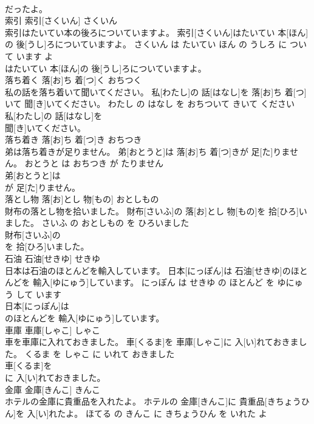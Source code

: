\documentclass[8pt]{extreport}
\begin{document}
\begin{CJK}{UTF8}{min}
\\	だったよ。			
\\	索引	索引[さくいん]	さくいん	
\\	索引はたいてい本の後ろについていますよ。	索引[さくいん]はたいてい 本[ほん]の 後[うし]ろについていますよ。	さくいん は たいてい ほん の うしろ に ついて います よ	
\\	はたいてい 本[ほん]の 後[うし]ろについていますよ。			
\\	落ち着く	落[お]ち 着[つ]く	おちつく	
\\	私の話を落ち着いて聞いてください。	私[わたし]の 話[はなし]を 落[お]ち 着[つ]いて 聞[き]いてください。	わたし の はなし を おちついて きいて ください	
\\	私[わたし]の 話[はなし]を
\\	聞[き]いてください。			
\\	落ち着き	落[お]ち 着[つ]き	おちつき	
\\	弟は落ち着きが足りません。	弟[おとうと]は 落[お]ち 着[つ]きが 足[た]りません。	おとうと は おちつき が たりません	
\\	弟[おとうと]は
\\	が 足[た]りません。			
\\	落とし物	落[お]とし 物[もの]	おとしもの	
\\	財布の落とし物を拾いました。	財布[さいふ]の 落[お]とし 物[もの]を 拾[ひろ]いました。	さいふ の おとしもの を ひろいました	
\\	財布[さいふ]の
\\	を 拾[ひろ]いました。			
\\	石油	石油[せきゆ]	せきゆ	
\\	日本は石油のほとんどを輸入しています。	日本[にっぽん]は 石油[せきゆ]のほとんどを 輸入[ゆにゅう]しています。	にっぽん は せきゆ の ほとんど を ゆにゅう して います	
\\	日本[にっぽん]は
\\	のほとんどを 輸入[ゆにゅう]しています。			
\\	車庫	車庫[しゃこ]	しゃこ	
\\	車を車庫に入れておきました。	車[くるま]を 車庫[しゃこ]に 入[い]れておきました。	くるま を しゃこ に いれて おきました	
\\	車[くるま]を
\\	に 入[い]れておきました。			
\\	金庫	金庫[きんこ]	きんこ	
\\	ホテルの金庫に貴重品を入れたよ。	ホテルの 金庫[きんこ]に 貴重品[きちょうひん]を 入[い]れたよ。	ほてる の きんこ に きちょうひん を いれた よ	

\end{CJK}
\end{document}
